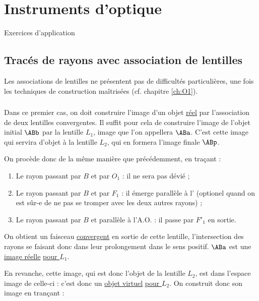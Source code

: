 \documentclass[../main/main.tex]{subfiles}
\begin{document}
\chapter{Instruments d'optique}
\vspace*{-47pt}
\begin{center}
    \Huge Exercices d'application
\end{center}
\section{Tracés de rayons avec association de lentilles}
Les associations de lentilles ne présentent pas de difficultés particulières,
une fois les techniques de construction maîtrisées (cf. chapitre \ref{ch:O1}).

\subsection{}
Dans ce premier cas, on doit construire l'image d'un objet \underline{réel} par
l'association de deux lentilles convergentes. Il suffit pour cela de construire
l'image de l'objet initial $\ABb$ par la lentille $L_1$, image que l'on appellera
$\ABa$. C'est cette image qui servira d'objet à la lentille $L_2$, qui en
formera l'image finale $\ABp$. \bigbreak

On procède donc de la même manière que précédemment, en traçant :
\begin{enumerate}
    \item Le rayon passant par $B$ et par $O_1$ : il ne sera pas dévié ;
    \item Le rayon passant par $B$ et par $F_1$ : il émerge parallèle à
        l' (optionel quand on est sûr-e de ne pas se
        tromper avec les deux autres rayons) ;
    \item Le rayon passant par $B$ et parallèle à l'A.O. : il passe par $F'_1$
        en sortie.
\end{enumerate}

On obtient un faisceau \underline{convergent} en sortie de cette lentille,
l'intersection des rayons se faisant donc dans leur prolongement dans le sens
positif. $\ABa$ est une \underline{image réelle} \underline{\underline{pour
$L_1$}}. \bigbreak

En revanche, cette image, qui est donc l'objet de la lentille $L_2$, est dans
l'espace image de celle-ci : c'est donc un \underline{objet virtuel}
\underline{\underline{pour $L_2$}}. On construit donc son image en trançant :
\end{document}
